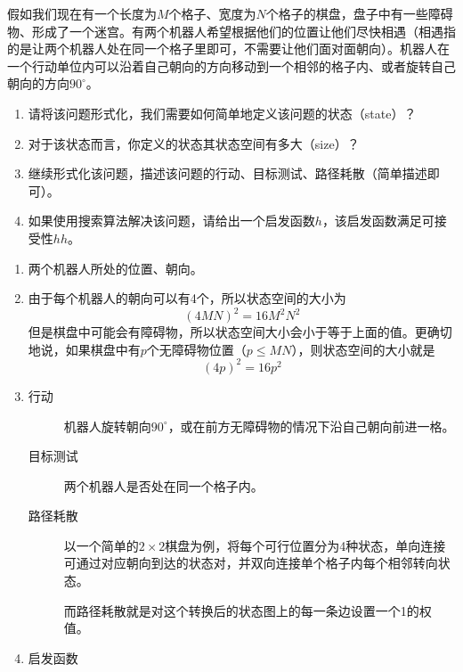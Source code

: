     \begin{problem}
        假如我们现在有一个长度为$M$个格子、宽度为$N$个格子的棋盘，盘子中有一些障碍物、形成了一个迷宫。有两个机器人希望根据他们的位置让他们尽快相遇（相遇指的是让两个机器人处在同一个格子里即可，不需要让他们面对面朝向）。机器人在一个行动单位内可以沿着自己朝向的方向移动到一个相邻的格子内、或者旋转自己朝向的方向$90^{\circ}$。
        \begin{enumerate}
            \item 请将该问题形式化，我们需要如何简单地定义该问题的状态（state）？
            \item 对于该状态而言，你定义的状态其状态空间有多大（size）？
            \item 继续形式化该问题，描述该问题的行动、目标测试、路径耗散（简单描述即可）。
            \item 如果使用搜索算法解决该问题，请给出一个启发函数$h$，该启发函数满足可接受性$hh$。
        \end{enumerate}
    \end{problem}

    \begin{solution}
        \begin{enumerate}
            \item 两个机器人所处的位置、朝向。
            \item 由于每个机器人的朝向可以有4个，所以状态空间的大小为
            \begin{equation*}
                (4MN)^2=16M^2N^2
            \end{equation*}
            但是棋盘中可能会有障碍物，所以状态空间大小会小于等于上面的值。更确切地说，如果棋盘中有$p$个无障碍物位置（$p\leq MN$），则状态空间的大小就是
            \begin{equation*}
                (4p)^2=16p^2
            \end{equation*}
            \item 
            \begin{description}
                \item[行动] 机器人旋转朝向$90^\circ$，或在前方无障碍物的情况下沿自己朝向前进一格。
                \item[目标测试] 两个机器人是否处在同一个格子内。
                \item[路径耗散] 以一个简单的$2\times 2$棋盘为例，将每个可行位置分为4种状态，单向连接可通过对应朝向到达的状态对，并双向连接单个格子内每个相邻转向状态。
                \begin{figure}[H]
                    \centering
                    
                \end{figure} 
                而路径耗散就是对这个转换后的状态图上的每一条边设置一个1的权值。
            \end{description}
            \item 启发函数
        \end{enumerate}
    \end{solution}

